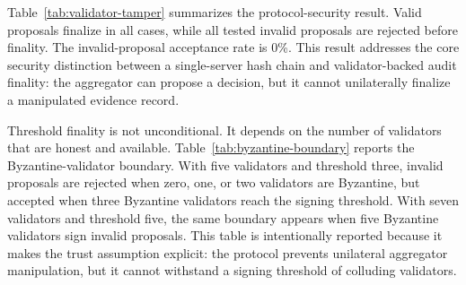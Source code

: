 \documentclass[preprint,authoryear,12pt]{elsarticle}
\begin{document}
Table~\ref{tab:validator-tamper} summarizes the protocol-security result. Valid proposals finalize in all cases, while all tested invalid proposals are rejected before finality. The invalid-proposal acceptance rate is 0\%. This result addresses the core security distinction between a single-server hash chain and validator-backed audit finality: the aggregator can propose a decision, but it cannot unilaterally finalize a manipulated evidence record.

\begin{table}[t]
\centering
\caption{Validator-backed finality under aggregator and payload tampering. Values summarize 39 proposed-method runs and 3600 valid audit blocks.}
\label{tab:validator-tamper}
\end{table}

Threshold finality is not unconditional. It depends on the number of validators that are honest and available. Table~\ref{tab:byzantine-boundary} reports the Byzantine-validator boundary. With five validators and threshold three, invalid proposals are rejected when zero, one, or two validators are Byzantine, but accepted when three Byzantine validators reach the signing threshold. With seven validators and threshold five, the same boundary appears when five Byzantine validators sign invalid proposals. This table is intentionally reported because it makes the trust assumption explicit: the protocol prevents unilateral aggregator manipulation, but it cannot withstand a signing threshold of colluding validators.
\end{document}
